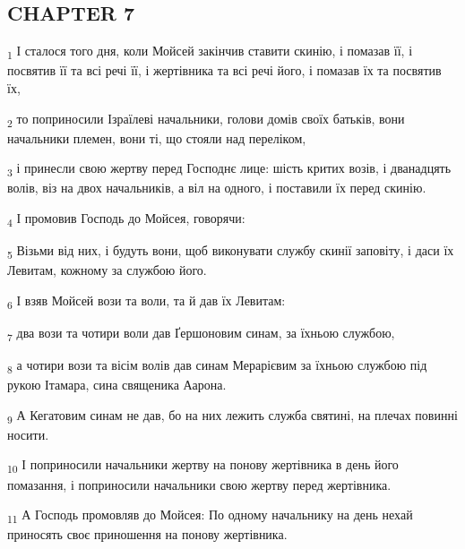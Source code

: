 \subsection{CHAPTER 7}
\begin{tcolorbox}
\textsubscript{1} І сталося того дня, коли Мойсей закінчив ставити скинію, і помазав її, і посвятив її та всі речі її, і жертівника та всі речі його, і помазав їх та посвятив їх,
\end{tcolorbox}
\begin{tcolorbox}
\textsubscript{2} то поприносили Ізраїлеві начальники, голови домів своїх батьків, вони начальники племен, вони ті, що стояли над переліком,
\end{tcolorbox}
\begin{tcolorbox}
\textsubscript{3} і принесли свою жертву перед Господнє лице: шість критих возів, і дванадцять волів, віз на двох начальників, а віл на одного, і поставили їх перед скинію.
\end{tcolorbox}
\begin{tcolorbox}
\textsubscript{4} І промовив Господь до Мойсея, говорячи:
\end{tcolorbox}
\begin{tcolorbox}
\textsubscript{5} Візьми від них, і будуть вони, щоб виконувати службу скинії заповіту, і даси їх Левитам, кожному за службою його.
\end{tcolorbox}
\begin{tcolorbox}
\textsubscript{6} І взяв Мойсей вози та воли, та й дав їх Левитам:
\end{tcolorbox}
\begin{tcolorbox}
\textsubscript{7} два вози та чотири воли дав Ґершоновим синам, за їхньою службою,
\end{tcolorbox}
\begin{tcolorbox}
\textsubscript{8} а чотири вози та вісім волів дав синам Мерарієвим за їхньою службою під рукою Ітамара, сина священика Аарона.
\end{tcolorbox}
\begin{tcolorbox}
\textsubscript{9} А Кегатовим синам не дав, бо на них лежить служба святині, на плечах повинні носити.
\end{tcolorbox}
\begin{tcolorbox}
\textsubscript{10} І поприносили начальники жертву на понову жертівника в день його помазання, і поприносили начальники свою жертву перед жертівника.
\end{tcolorbox}
\begin{tcolorbox}
\textsubscript{11} А Господь промовляв до Мойсея: По одному начальнику на день нехай приносять своє приношення на понову жертівника.
\end{tcolorbox}
